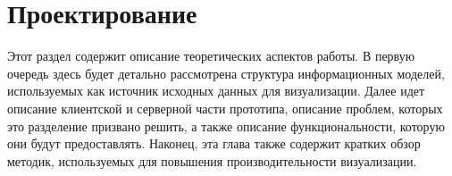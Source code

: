 ﻿\section{Проектирование}

Этот раздел содержит описание теоретических аспектов работы.
В первую очередь здесь будет детально рассмотрена
структура информационных моделей,
используемых как источник исходных данных для визуализации.
Далее идет описание клиентской и серверной части прототипа,
описание проблем, которых это разделение призвано решить,
а также описание функциональности, которую они будут предоставлять.
Наконец, эта глава также содержит кратких обзор методик,
используемых для повышения производительности визуализации.





